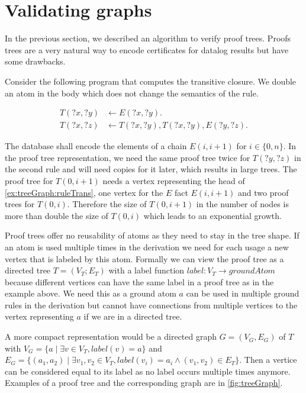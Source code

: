 \chapter{Validating graphs}\label{sec:valGraph}

In the previous section, we described an algorithm to verify proof trees. Proofs trees are a very natural way to encode certificates for datalog results but have some drawbacks. 

\begin{example}\label{ex:treeGraph}
    Consider the following program that computes the transitive closure. We double an atom in the body which does not change the semantics of the rule. 

    \begin{align}
            T(?x,?y) &\leftarrow E(?x,?y). \label{ex:treeGraph:ruleBase}\\
            T(?x,?z) &\leftarrow T(?x, ?y), T(?x, ?y), E(?y, ?z). \label{ex:treeGraph:ruleTrans}
    \end{align}

    The database shall encode the elements of a chain $E(i, i+1)$ for $i \in \{0, n\}$. In the proof tree representation, we need the same proof tree twice for $T(?y, ?z)$ in the second rule and will need copies for it later, which results in large trees. The proof tree for $T(0, i+1)$ needs a vertex representing the head of \cref{ex:treeGraph:ruleTrans}, one vertex for the $E$ fact $E(i, i+1)$ and two proof trees for $T(0, i)$. Therefore the size of $T(0, i+1)$ in the number of nodes is more than double the size of $T(0, i)$ which leads to an exponential growth.
\end{example}

Proof trees offer no reusability of atoms as they need to stay in the tree shape. If an atom is used multiple times in the derivation we need for each usage a new vertex that is labeled by this atom. Formally we can view the proof tree as a directed tree $T= (V_T;E_T)$ with a label function $label: V_T \to groundAtom$ because different vertices can have the same label in a proof tree as in the example above. We need this as a ground atom $a$ can be used in multiple ground rules in the derivation but cannot have connections from multiple vertices to the vertex representing $a$ if we are in a directed tree.

A more compact representation would be a directed graph $G=(V_G, E_G)$ of $T$  with $V_G = \{a \mid \exists v \in V_T, label(v)=a\}$ and $E_G = \{ (a_1, a_2) \mid \exists v_1, v_2 \in V_T,  label(v_i) = a_i \land (v_1, v_2) \in E_T\}$. Then a vertice can be considered equal to its label as no label occurs multiple times anymore. Examples of a proof tree and the corresponding graph are in \cref{fig:treeGraph}.


